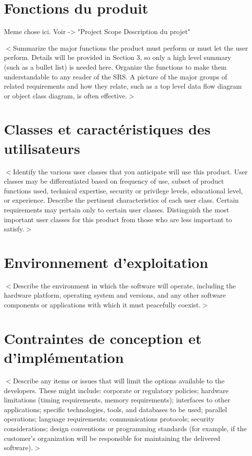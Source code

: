 \documentclass[titlepage, 12pt]{report}
\begin{document}
\section{Fonctions du produit}

Meme chose ici. Voir -> "Project Scope Description du projet"

$<$Summarize the major functions the product must perform or must let the user 
perform. Details will be provided in Section 3, so only a high level summary 
(such as a bullet list) is needed here. Organize the functions to make them 
understandable to any reader of the SRS. A picture of the major groups of 
related requirements and how they relate, such as a top level data flow diagram 
or object class diagram, is often effective.$>$

\section{Classes et caractéristiques des utilisateurs}
$<$Identify the various user classes that you anticipate will use this product.  
User classes may be differentiated based on frequency of use, subset of product 
functions used, technical expertise, security or privilege levels, educational 
level, or experience. Describe the pertinent characteristics of each user class.  
Certain requirements may pertain only to certain user classes. Distinguish the 
most important user classes for this product from those who are less important 
to satisfy.$>$

\section{Environnement d'exploitation}
$<$Describe the environment in which the software will operate, including the 
hardware platform, operating system and versions, and any other software 
components or applications with which it must peacefully coexist.$>$

\section{Contraintes de conception et d'implémentation}
$<$Describe any items or issues that will limit the options available to the 
developers. These might include: corporate or regulatory policies; hardware 
limitations (timing requirements, memory requirements); interfaces to other 
applications; specific technologies, tools, and databases to be used; parallel 
operations; language requirements; communications protocols; security 
considerations; design conventions or programming standards (for example, if the 
customer’s organization will be responsible for maintaining the delivered 
software).$>$
\end{document}
